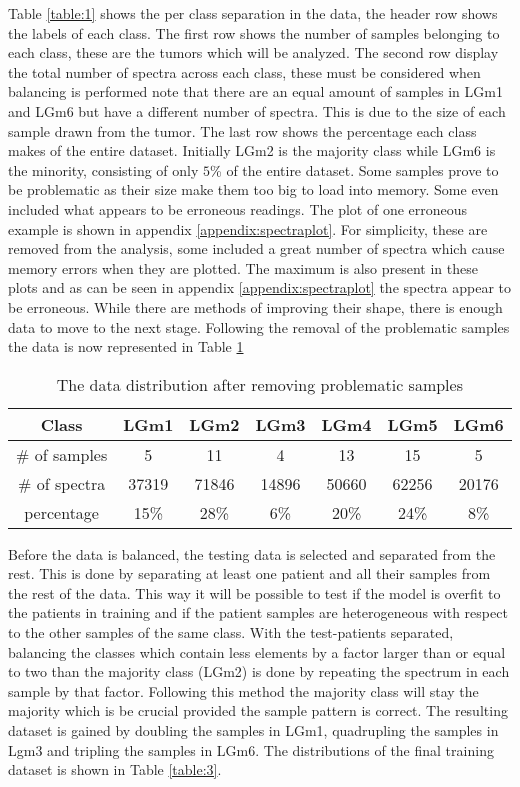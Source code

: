 \newpage
Table \ref{table:1} shows the per class separation in the data, the header row shows the labels of each class. The first row shows the number of samples belonging to each class, these are the tumors which will be analyzed. The second row display the total number of spectra across each class, these must be considered when balancing is performed note that there are an equal amount of samples in LGm1 and LGm6 but have a different number of spectra. This is due to the size of each sample drawn from the tumor. The last row shows the percentage each class makes of the entire dataset. Initially LGm2 is the majority class while LGm6 is the minority, consisting of only $5$\% of the entire dataset. Some samples prove to be problematic as their size make them too big to load into memory. Some even included what appears to be erroneous readings. The plot of one erroneous example is shown in appendix \ref{appendix:spectraplot}. For simplicity, these are removed from the analysis, some included a great number of spectra which cause memory errors when they are plotted. The maximum is also present in these plots and as can be seen in appendix \ref{appendix:spectraplot} the spectra appear to be erroneous. While there are methods of improving their shape, there is enough data to move to the next stage. Following the removal of the problematic samples the data is now represented in Table \ref{table:2}
\\

\begin{table}[h!]
\centering
 \begin{tabular}{||c c c c c c c||} 
 \hline
 Class & LGm1 & LGm2 & LGm3 & LGm4 & LGm5 & LGm6 \\ [0.5ex] 
 \hline\hline
 \# of samples & 5& 11 & 4 & 13 & 15 & 5 \\ 
 \hline
 \# of spectra & 37319 & 71846 & 14896 & 50660 & 62256 & 20176 \\
 \hline
 percentage & 15\%& 28\% & 6\% & 20\% & 24\% & 8\% \\
 \hline

\end{tabular}
\caption{The data distribution after removing problematic samples}
\label{table:2}
\end{table}


Before the data is balanced, the testing data is selected and separated from the rest. This is done by separating at least one patient and all their samples from the rest of the data. This way it will be possible to test if the model is overfit to the patients in training and if the patient samples are heterogeneous  with respect to the other samples of the same class. With the test-patients separated, balancing the classes which contain less elements by a factor larger than or equal to two than the majority class (LGm2) is done by repeating the spectrum in each sample by that factor. Following this method the majority class will stay the majority which is be crucial provided the sample pattern is correct. The resulting dataset is gained by doubling the samples in LGm1, quadrupling the samples in Lgm3 and tripling the samples in LGm6. The distributions of the final training dataset is shown in Table \ref{table:3}.


